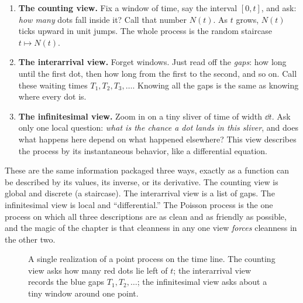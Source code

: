 \begin{enumerate}
\item \textbf{The counting view.} Fix a window of time, say the interval
$[0,t]$, and ask: \emph{how many} dots fall inside it? Call that number $N(t)$.
As $t$ grows, $N(t)$ ticks upward in unit jumps. The whole process is the random
staircase $t \mapsto N(t)$.
\item \textbf{The interarrival view.} Forget windows. Just read off the
\emph{gaps}: how long until the first dot, then how long from the first to the
second, and so on. Call these waiting times $T_1, T_2, T_3, \dots$. Knowing all
the gaps is the same as knowing where every dot is.
\item \textbf{The infinitesimal view.} Zoom in on a tiny sliver of time of width
$\dd t$. Ask only one local question: \emph{what is the chance a dot lands in
this sliver}, and does what happens here depend on what happened elsewhere? This
view describes the process by its instantaneous behavior, like a differential
equation.
\end{enumerate}

\begin{intuitionbox}
These are the same information packaged three ways, exactly as a function can be
described by its values, its inverse, or its derivative. The counting view is
global and discrete (a staircase). The interarrival view is a list of gaps. The
infinitesimal view is local and ``differential.'' The Poisson process is the one
process on which all three descriptions are as clean and as friendly as
possible, and the magic of the chapter is that cleanness in any one view
\emph{forces} cleanness in the other two.
\end{intuitionbox}

\begin{figure}[H]
\centering
{}
\caption{A single realization of a point process on the time line. The counting
view asks how many red dots lie left of $t$; the interarrival view records the
blue gaps $T_1, T_2, \dots$; the infinitesimal view asks about a tiny window
around one point.}
\label{ch25:fig-pointprocess}
\end{figure}


